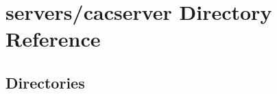 \section{servers/cacserver Directory Reference}
\label{dir_fe0c3ec17fe79c329b1cb4fbb3c62915}
\subsection*{Directories}
\begin{DoxyCompactItemize}
\end{DoxyCompactItemize}
